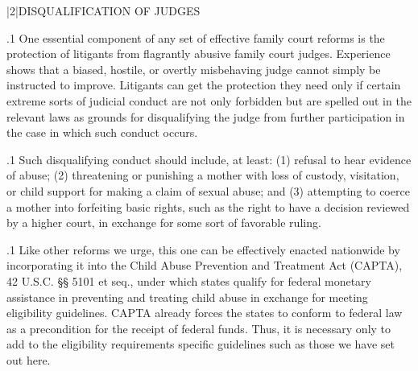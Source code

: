 \documentclass[11pt, twoside]{article}
\begin{document}
{\s|2|{DISQUALIFICATION OF JUDGES}

\p.1{%
\noindent{}One essential component of any set of effective family court reforms is
the protection of litigants from flagrantly abusive family court judges.
Experience shows that a biased, hostile, or overtly misbehaving judge
cannot simply be instructed to improve. Litigants can get the protection
they need only if certain extreme sorts of judicial conduct are not only
forbidden but are spelled out in the relevant laws as grounds for disqualifying the judge from further participation in the case in which such
conduct occurs.
}%

\p.1{%
Such disqualifying conduct should include, at least: (1) refusal to hear
evidence of abuse; (2) threatening or punishing a mother with loss of
custody, visitation, or child support for making a claim of sexual abuse;
and (3) attempting to coerce a mother into forfeiting basic rights, such
as the right to have a decision reviewed by a higher court, in exchange
for some sort of favorable ruling.
}%

\p.1{%
Like other reforms we urge, this one can be effectively enacted nationwide by incorporating it into the Child Abuse Prevention and Treatment Act (CAPTA), 42 U.S.C. §§ 5101 et seq.,
under which states qualify for federal monetary assistance in preventing
and treating child abuse in exchange for meeting eligibility guidelines.
CAPTA already forces the states to conform to federal law as a precondition for the receipt of federal funds. Thus, it is necessary only to add
to the eligibility requirements specific guidelines such as those we have
set out here.
}%





}
\end{document}
